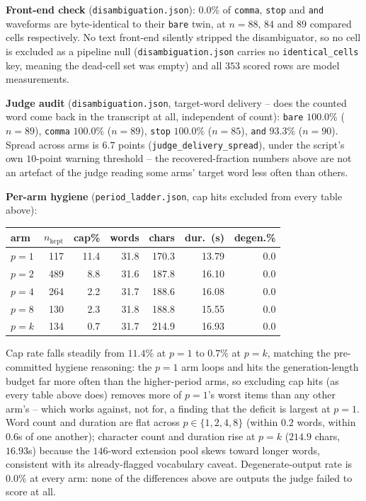 \documentclass[11pt]{article}
\begin{document}
\textbf{Front-end check} (\texttt{disambiguation.json}): $0.0\%$ of
\texttt{comma}, \texttt{stop} and \texttt{and} waveforms are byte-identical to
their \texttt{bare} twin, at $n=88$, $84$ and $89$ compared cells
respectively. No text front-end silently stripped the disambiguator, so no
cell is excluded as a pipeline null (\texttt{disambiguation.json} carries no
\texttt{identical\_cells} key, meaning the dead-cell set was empty) and all
$353$ scored rows are model measurements.

\textbf{Judge audit} (\texttt{disambiguation.json}, target-word delivery --
does the counted word come back in the transcript at all, independent of
count): \texttt{bare} $100.0\%$ ($n{=}89$), \texttt{comma} $100.0\%$
($n{=}89$), \texttt{stop} $100.0\%$ ($n{=}85$), \texttt{and} $93.3\%$
($n{=}90$). Spread across arms is $6.7$ points
(\texttt{judge\_delivery\_spread}), under the script's own $10$-point warning
threshold -- the recovered-fraction numbers above are not an artefact of the
judge reading some arms' target word less often than others.

\textbf{Per-arm hygiene} (\texttt{period\_ladder.json}, cap hits excluded from
every table above):

\begin{center}
\begin{tabular}{@{}lrrrrrr@{}}
\toprule
arm & $n_{\text{kept}}$ & cap\% & words & chars & dur.\ (s) & degen.\% \\
\midrule
$p{=}1$ & 117 & 11.4 & 31.8 & 170.3 & 13.79 & 0.0 \\
$p{=}2$ & 489 &  8.8 & 31.6 & 187.8 & 16.10 & 0.0 \\
$p{=}4$ & 264 &  2.2 & 31.7 & 188.6 & 16.08 & 0.0 \\
$p{=}8$ & 130 &  2.3 & 31.8 & 188.8 & 15.55 & 0.0 \\
$p{=}k$ & 134 &  0.7 & 31.7 & 214.9 & 16.93 & 0.0 \\
\bottomrule
\end{tabular}
\end{center}

\noindent Cap rate falls steadily from $11.4\%$ at $p{=}1$ to $0.7\%$ at
$p{=}k$, matching the pre-committed hygiene reasoning: the $p=1$ arm loops
and hits the generation-length budget far more often than the higher-period
arms, so excluding cap hits (as every table above does) removes more of
$p=1$'s worst items than any other arm's -- which works against, not for, a
finding that the deficit is largest at $p=1$. Word count and duration are
flat across $p\in\{1,2,4,8\}$ (within $0.2$ words, within $0.6$s of one
another); character count and duration rise at $p=k$ ($214.9$ chars,
$16.93$s) because the $146$-word extension pool skews toward longer words,
consistent with its already-flagged vocabulary caveat. Degenerate-output rate
is $0.0\%$ at every arm: none of the differences above are outputs the judge
failed to score at all.
\end{document}
